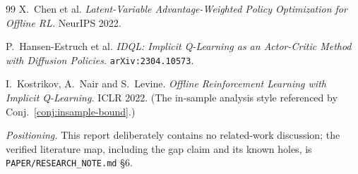 \documentclass[11pt]{article}
\theoremstyle{plain}
\theoremstyle{definition}
\theoremstyle{remark}
\newcommand{\1}{\mathbf 1}
\begin{document}
\begin{thebibliography}{99}
 X.~Chen et al.
  \emph{Latent-Variable Advantage-Weighted Policy Optimization for Offline RL.}
  NeurIPS 2022.

 P.~Hansen-Estruch et al.
  \emph{IDQL: Implicit Q-Learning as an Actor-Critic Method with Diffusion Policies.}
  \texttt{arXiv:2304.10573}.

 I.~Kostrikov, A.~Nair and S.~Levine.
  \emph{Offline Reinforcement Learning with Implicit Q-Learning.} ICLR 2022.
  (The in-sample analysis style referenced by Conj.~\ref{conj:insample-bound}.)

\end{thebibliography}

\noindent
\emph{Positioning.} This report deliberately contains no related-work discussion; the
verified literature map, including the gap claim and its known holes, is
\texttt{PAPER/RESEARCH\_NOTE.md} \S6.
\end{document}

